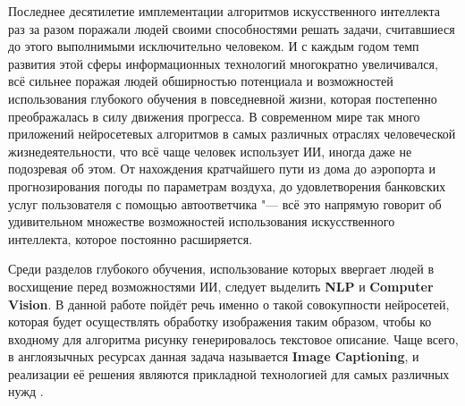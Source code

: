\documentclass[bachelor, och, coursework]{SCWorks}
\begin{document}


\tableofcontents

\intro

    Последнее десятилетие имплементации алгоритмов искусственного интеллекта раз
    за разом поражали людей своими способностями решать задачи, считавшиеся до
    этого выполнимыми исключительно человеком. И с каждым годом темп развития
    этой сферы информационных технологий многократно увеличивался, всё сильнее
    поражая людей обширностью потенциала и возможностей использования глубокого
    обучения в повседневной жизни, которая постепенно преображалась в силу
    движения прогресса. В современном мире так много приложений нейросетевых
    алгоритмов в самых различных отраслях человеческой жизнедеятельности, что
    всё чаще человек использует ИИ, иногда даже не подозревая об этом. От
    нахождения кратчайшего пути из дома до аэропорта и прогнозирования погоды по
    параметрам воздуха, до удовлетворения банковских услуг пользователя
    с помощью автоответчика "--- всё это напрямую говорит об удивительном
    множестве возможностей использования искусственного интеллекта, которое
    постоянно расширяется.
    
    Среди разделов глубокого обучения, использование которых ввергает людей в
    восхищение перед возможностями ИИ, следует выделить \textbf{NLP} и
    \textbf{Computer Vision}. В данной работе пойдёт речь именно о такой
    совокупности нейросетей, которая будет осуществлять обработку изображения
    таким образом, чтобы ко входному для алгоритма рисунку генерировалось
    текстовое описание. Чаще всего, в англоязычных ресурсах данная задача
    называется \textbf{Image Captioning}, и реализации её решения являются
    прикладной технологией для самых различных нужд \cite{neur}.

\end{document}
